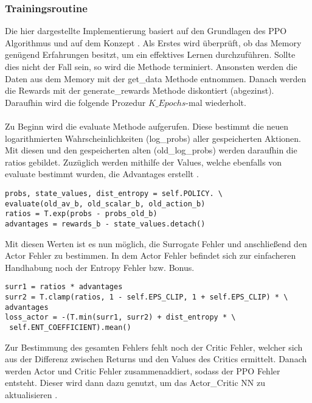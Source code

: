 \subsubsection{Trainingsroutine} \label{subsubsec:Implementierung_Trainingsroutine_PPO}
Die hier dargestellte Implementierung basiert auf den Grundlagen des PPO Algorithmus  und auf dem Konzept .
Als Erstes wird überprüft, ob das Memory genügend Erfahrungen besitzt, um ein effektives Lernen durchzuführen. Sollte dies nicht der Fall sein, so wird die Methode terminiert. 
Ansonsten werden die Daten aus dem Memory mit der get\_data Methode entnommen.
Danach werden die Rewards mit der generate\_rewards Methode diskontiert (abgezinst).\\
Daraufhin wird die folgende Prozedur $K\_Epochs$-mal wiederholt.\\
\\Zu Beginn wird die evaluate Methode aufgerufen. Diese bestimmt die neuen logarithmierten Wahrscheinlichkeiten (log\_probs) aller gespeicherten Aktionen. Mit diesen und den gespeicherten alten (old\_log\_probs) werden daraufhin die ratios gebildet.
Zuzüglich werden mithilfe der Values, welche ebenfalls von evaluate bestimmt wurden, die Advantages erstellt .
\begin{lstlisting}[caption=Bestimmung der Ratios und Advantages, label=code:Bestimmung_Ratio_Advantages, style=Python]
probs, state_values, dist_entropy = self.POLICY. \
evaluate(old_av_b, old_scalar_b, old_action_b)	
ratios = T.exp(probs - probs_old_b)	
advantages = rewards_b - state_values.detach()
\end{lstlisting}
Mit diesen Werten ist es nun möglich, die Surrogate Fehler und anschließend den Actor Fehler zu bestimmen.
In dem Actor Fehler befindet sich zur einfacheren Handhabung noch der Entropy Fehler bzw. Bonus.
\newpage
\begin{lstlisting}[caption=Bestimmung des Surrogate und Actor Fehlers, label=code:Bestimmung_Surrogate_Losses, style=Python]
surr1 = ratios * advantages
surr2 = T.clamp(ratios, 1 - self.EPS_CLIP, 1 + self.EPS_CLIP) * \
advantages
loss_actor = -(T.min(surr1, surr2) + dist_entropy * \
 self.ENT_COEFFICIENT).mean()
\end{lstlisting}
Zur Bestimmung des gesamten Fehlers fehlt noch der Critic Fehler, welcher sich aus der Differenz zwischen Returns und den Values des Critics ermittelt.
Danach werden Actor und Critic Fehler zusammenaddiert, sodass der PPO Fehler entsteht. Dieser wird dann dazu genutzt, um das Actor\_Critic NN zu aktualisieren .
